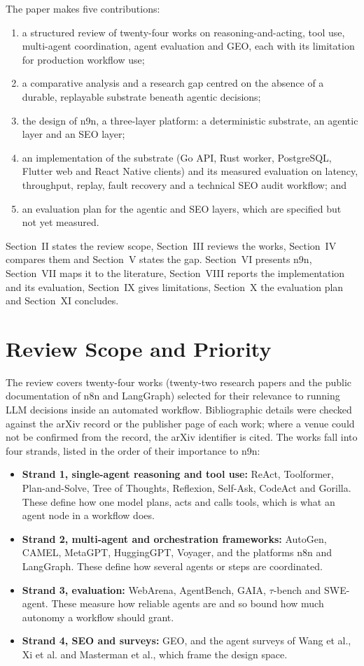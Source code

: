 \documentclass[conference]{IEEEtran}
\begin{document}
The paper makes five contributions:
\begin{enumerate}
\item a structured review of twenty-four works on reasoning-and-acting, tool use, multi-agent coordination, agent evaluation and GEO, each with its limitation for production workflow use;
\item a comparative analysis and a research gap centred on the absence of a durable, replayable substrate beneath agentic decisions;
\item the design of n9n, a three-layer platform: a deterministic substrate, an agentic layer and an SEO layer;
\item an implementation of the substrate (Go API, Rust worker, PostgreSQL, Flutter web and React Native clients) and its measured evaluation on latency, throughput, replay, fault recovery and a technical SEO audit workflow; and
\item an evaluation plan for the agentic and SEO layers, which are specified but not yet measured.
\end{enumerate}
Section~II states the review scope, Section~III reviews the works, Section~IV compares them and Section~V states the gap. Section~VI presents n9n, Section~VII maps it to the literature, Section~VIII reports the implementation and its evaluation, Section~IX gives limitations, Section~X the evaluation plan and Section~XI concludes.

\section{Review Scope and Priority}
The review covers twenty-four works (twenty-two research papers and the public documentation of n8n and LangGraph) selected for their relevance to running LLM decisions inside an automated workflow. Bibliographic details were checked against the arXiv record or the publisher page of each work; where a venue could not be confirmed from the record, the arXiv identifier is cited. The works fall into four strands, listed in the order of their importance to n9n:
\begin{itemize}
\item \textbf{Strand 1, single-agent reasoning and tool use:} ReAct, Toolformer, Plan-and-Solve, Tree of Thoughts, Reflexion, Self-Ask, CodeAct and Gorilla. These define how one model plans, acts and calls tools, which is what an agent node in a workflow does.
\item \textbf{Strand 2, multi-agent and orchestration frameworks:} AutoGen, CAMEL, MetaGPT, HuggingGPT, Voyager, and the platforms n8n and LangGraph. These define how several agents or steps are coordinated.
\item \textbf{Strand 3, evaluation:} WebArena, AgentBench, GAIA, $\tau$-bench and SWE-agent. These measure how reliable agents are and so bound how much autonomy a workflow should grant.
\item \textbf{Strand 4, SEO and surveys:} GEO, and the agent surveys of Wang et al., Xi et al. and Masterman et al., which frame the design space.
\end{itemize}
\end{document}
